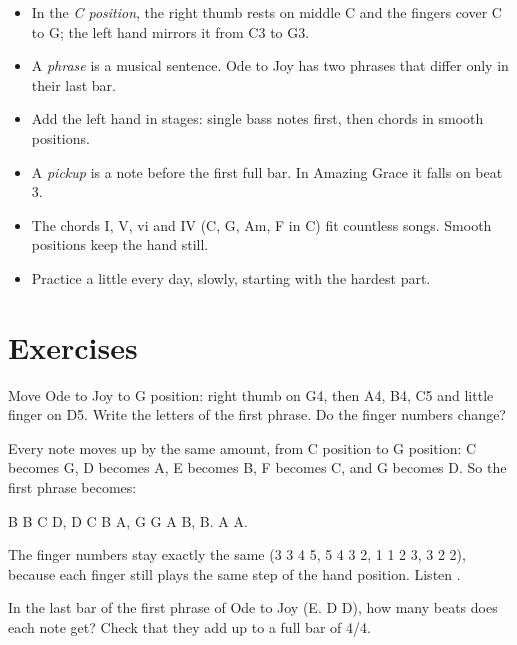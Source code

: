 \begin{summarybox}
\begin{itemize}
  \item In the \emph{C position}, the right thumb rests on middle C and the fingers cover C to G; the left hand mirrors it from C3 to G3.
  \item A \emph{phrase} is a musical sentence. Ode to Joy has two phrases that differ only in their last bar.
  \item Add the left hand in stages: single bass notes first, then chords in smooth positions.
  \item A \emph{pickup} is a note before the first full bar. In Amazing Grace it falls on beat 3.
  \item The chords I, V, vi and IV (C, G, Am, F in C) fit countless songs. Smooth positions keep the hand still.
  \item Practice a little every day, slowly, starting with the hardest part.
\end{itemize}
\end{summarybox}

\section*{Exercises}

\begin{exercise}
Move Ode to Joy to G position: right thumb on G4, then A4, B4, C5 and little finger on D5. Write the letters of the first phrase. Do the finger numbers change?
\end{exercise}

\begin{answerbox}
Every note moves up by the same amount, from C position to G position: C becomes G, D becomes A, E becomes B, F becomes C, and G becomes D. So the first phrase becomes:

B B C D, D C B A, G G A B, B. A A.

The finger numbers stay exactly the same (3 3 4 5, 5 4 3 2, 1 1 2 3, 3 2 2), because each finger still plays the same step of the hand position. Listen .
\end{answerbox}

\begin{exercise}
In the last bar of the first phrase of Ode to Joy (E. D D), how many beats does each note get? Check that they add up to a full bar of 4/4.
\end{exercise}

